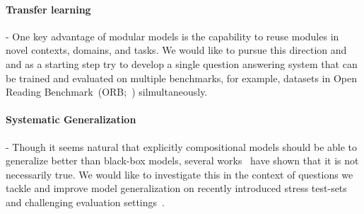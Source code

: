 \documentclass[main.tex]{subfiles}
\begin{document}
\paragraph{Transfer learning} - One key advantage of modular models is the capability to reuse modules in novel contexts, domains, and tasks. We would like to pursue this direction and and as a starting step try to develop a single question answering system that can be trained and evaluated on multiple benchmarks, for example, datasets in Open Reading Benchmark~(ORB;~) silmultaneously.

\paragraph{Systematic Generalization} -
Though it seems natural that explicitly compositional models should be able to generalize better than black-box models, several works~\cite{sys-generalization-2018,closure-generalization-2020} have shown that it is not necessarily true. We would like to investigate this in the context of questions we tackle and improve model generalization on recently introduced stress test-sets~\cite{contrast-sets-2020} and challenging evaluation settings~\cite{text2sql-2018}.












\end{document}
